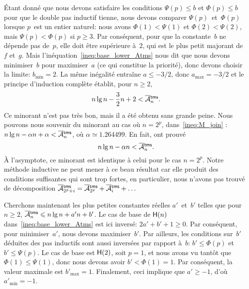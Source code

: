 Étant donné que nous devons satisfaire les conditions \(\Psi(p)
\leqslant b\) et \(\Phi(p) \leqslant b\) pour que le double pas
inductif tienne, nous devons comparer \(\Psi(p)\)~et~\(\Phi(p)\)
lorsque \(p\)~est un entier naturel: nous avons \(\Phi(1) < \Psi(1)\)
et \(\Phi(2) < \Psi(2)\), mais \(\Psi(p) < \Phi(p)\) si \(p \geqslant
3\). Par conséquent, pour que la constante~\(b\) ne dépende pas
de~\(p\), elle doit être supérieure à~\(2\), qui est le plus petit
majorant de~\(f\) et~\(g\).  Mais
l'inéquation~\eqref{ineq:base_lower_Atms} nous dit que nous devons
minimiser~\(b\) pour maximiser~\(a\) (ce qui constitue la priorité),
donc devons choisir la limite: \(b_{\min} = 2\). La même inégalité
entraîne \(a \leqslant -3/2\), donc \(a_{\max} = -3/2\) et le principe
d'induction complète établit, pour \(n \geqslant 2\),
\begin{equation}
n\lg n - \frac{3}{2} n + 2 < \OM{\fun{tms}}{n}.
\label{ineq:lower_Atms}
\end{equation}
Ce minorant n'est pas très bon, mais il a été obtenu sans grande
peine. Nous pouvons nous souvenir du minorant au cas où \(n=2^p\),
dans~\eqref{ineq:M_join} : \(n\lg n - \alpha n +
\alpha < \OM{\fun{tms}}{n}\), où \(\alpha \simeq 1.264499\). En fait,
\cite{FlajoletGolin_1994} ont prouvé
\begin{equation}
n\lg n - \alpha n < \OM{\fun{tms}}{n}.
\label{ineq:best_lower_Atms}
\end{equation}
À l'asymptote, ce minorant est identique à celui pour le cas
\(n=2^p\). Notre méthode inductive ne peut mener à ce beau résultat
car elle produit des conditions suffisantes qui sont trop fortes, en
particulier, nous n'avons pas trouvé de décomposition
\(\OM{\fun{tms}}{2^p+i} = \OM{\fun{tms}}{2^p} + \OM{\fun{tms}}{i} +
\dots\)

Cherchons maintenant les plus petites constantes réelles
\(a'\)~et~\(b'\) telles que pour \(n \geqslant 2\),
\(\OM{\fun{tms}}{n} \leqslant n\lg n + a'n + b'\). Le cas de base de
\(\textsf{H}({n})\) dans~\eqref{ineq:base_lower_Atms} est ici inversé:
\(2a' + b' + 1 \geqslant 0\). Par conséquent, pour minimiser~\(a'\),
nous devons maximiser~\(b'\). Par ailleurs, les conditions sur~\(b'\)
déduites des pas inductifs sont aussi inversées par rapport à~\(b\):
\(b' \leqslant \Phi(p)\) et \(b' \leqslant \Psi(p)\). Le cas de base
est \(\textsf{H}({2})\), soit \(p=1\), et nous avons vu tantôt que
\(\Phi(1) \leqslant \Psi(1)\), donc nous devons avoir \(b'< \Phi(1) =
1\). Par conséquent, la valeur maximale est \(b'_{\max} =
1\). Finalement, ceci implique que \(a'\geqslant -1\), d'où
\(a'_{\min} = -1\).

